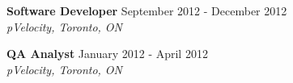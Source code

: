 \documentclass[10pt]{res} %
\begin{document}
\textbf{Software Developer} \hfill September 2012 - December 2012 \\[2pt]
{\sl pVelocity, Toronto, ON} 

\textbf{QA Analyst} \hfill January 2012 - April 2012 \\[2pt]
{\sl pVelocity, Toronto, ON} 






\end{document}
